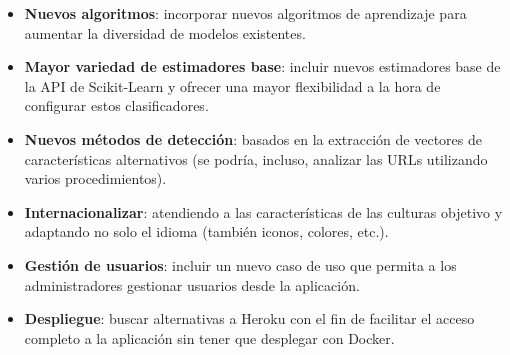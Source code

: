 \begin{itemize}
	\item \textbf{Nuevos algoritmos}: incorporar nuevos algoritmos de aprendizaje para aumentar la diversidad de modelos existentes.
	\item  \textbf{Mayor variedad de estimadores base}: incluir nuevos estimadores base de la API de Scikit-Learn y ofrecer una mayor flexibilidad a la hora de configurar estos clasificadores.
	\item \textbf{Nuevos métodos de detección}: basados en la extracción de vectores de características alternativos (se podría, incluso, analizar las URLs utilizando varios procedimientos).
	\item \textbf{Internacionalizar}: atendiendo a las características de las culturas objetivo y adaptando no solo el idioma (también iconos, colores, etc.).
	\item \textbf{Gestión de usuarios}: incluir un nuevo caso de uso que permita a los administradores gestionar usuarios desde la aplicación.
	\item \textbf{Despliegue}: buscar alternativas a Heroku con el fin de facilitar el acceso completo a la aplicación sin tener que desplegar con Docker.
\end{itemize}